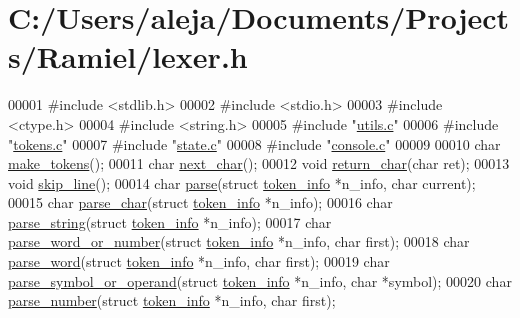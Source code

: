 \hypertarget{lexer_8h_source}{}\section{C\+:/\+Users/aleja/\+Documents/\+Projects/\+Ramiel/lexer.h}

\begin{DoxyCode}
00001 \textcolor{preprocessor}{#include <stdlib.h>}
00002 \textcolor{preprocessor}{#include <stdio.h>}
00003 \textcolor{preprocessor}{#include <ctype.h>}
00004 \textcolor{preprocessor}{#include <string.h>}
00005 \textcolor{preprocessor}{#include "\mbox{\hyperlink{utils_8c}{utils.c}}"}
00006 \textcolor{preprocessor}{#include "\mbox{\hyperlink{tokens_8c}{tokens.c}}"}
00007 \textcolor{preprocessor}{#include "\mbox{\hyperlink{state_8c}{state.c}}"}
00008 \textcolor{preprocessor}{#include "\mbox{\hyperlink{console_8c}{console.c}}"}
00009 
00010 \textcolor{keywordtype}{char} \mbox{\hyperlink{lexer_8h_a8db3533be305a7d06f211638b181c759}{make\_tokens}}();
00011 \textcolor{keywordtype}{char} \mbox{\hyperlink{lexer_8h_a1cec8a2aeca74877222503c23559481c}{next\_char}}();
00012 \textcolor{keywordtype}{void} \mbox{\hyperlink{lexer_8h_a76f73c7046672a685468fd43f4e39f7a}{return\_char}}(\textcolor{keywordtype}{char} ret);
00013 \textcolor{keywordtype}{void} \mbox{\hyperlink{lexer_8h_a13171cc94df93641fa41710249bd2828}{skip\_line}}();
00014 \textcolor{keywordtype}{char} \mbox{\hyperlink{lexer_8h_a78ebaafb96b3d12dfed4531dd6837376}{parse}}(\textcolor{keyword}{struct} \mbox{\hyperlink{structtoken__info}{token\_info}} *n\_info, \textcolor{keywordtype}{char} current);
00015 \textcolor{keywordtype}{char} \mbox{\hyperlink{lexer_8h_acc216fd4b60e32a23b2e4d9db0b2d0cf}{parse\_char}}(\textcolor{keyword}{struct} \mbox{\hyperlink{structtoken__info}{token\_info}} *n\_info);
00016 \textcolor{keywordtype}{char} \mbox{\hyperlink{lexer_8h_aeea57bbb18bef3c04e93da5c485b9807}{parse\_string}}(\textcolor{keyword}{struct} \mbox{\hyperlink{structtoken__info}{token\_info}} *n\_info);
00017 \textcolor{keywordtype}{char} \mbox{\hyperlink{lexer_8h_a68aeb6bc21ceefa78f024a869fc9c26f}{parse\_word\_or\_number}}(\textcolor{keyword}{struct} \mbox{\hyperlink{structtoken__info}{token\_info}} *n\_info, \textcolor{keywordtype}{char} first);
00018 \textcolor{keywordtype}{char} \mbox{\hyperlink{lexer_8h_abd11c1c48aff5f5a0d05faaa9f63d35e}{parse\_word}}(\textcolor{keyword}{struct} \mbox{\hyperlink{structtoken__info}{token\_info}} *n\_info, \textcolor{keywordtype}{char} first);
00019 \textcolor{keywordtype}{char} \mbox{\hyperlink{lexer_8h_a3bb717287608d3dea3d778274fca12a1}{parse\_symbol\_or\_operand}}(\textcolor{keyword}{struct} \mbox{\hyperlink{structtoken__info}{token\_info}} *n\_info, \textcolor{keywordtype}{char} *symbol);
00020 \textcolor{keywordtype}{char} \mbox{\hyperlink{lexer_8h_a4192d1910a1c02fc04bb68c99c5b8520}{parse\_number}}(\textcolor{keyword}{struct} \mbox{\hyperlink{structtoken__info}{token\_info}} *n\_info, \textcolor{keywordtype}{char} first);
\end{DoxyCode}
